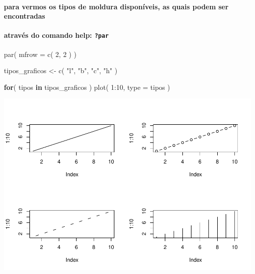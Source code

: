\documentclass[
]{article}
\newenvironment{Shaded}{\begin{snugshade}}{\end{snugshade}}
\newcommand{\AttributeTok}[1]{\textcolor[rgb]{0.77,0.63,0.00}{#1}}
\newcommand{\ControlFlowTok}[1]{\textcolor[rgb]{0.13,0.29,0.53}{\textbf{#1}}}
\newcommand{\DecValTok}[1]{\textcolor[rgb]{0.00,0.00,0.81}{#1}}
\newcommand{\FunctionTok}[1]{\textcolor[rgb]{0.00,0.00,0.00}{#1}}
\newcommand{\NormalTok}[1]{#1}
\newcommand{\OtherTok}[1]{\textcolor[rgb]{0.56,0.35,0.01}{#1}}
\newcommand{\SpecialCharTok}[1]{\textcolor[rgb]{0.00,0.00,0.00}{#1}}
\newcommand{\StringTok}[1]{\textcolor[rgb]{0.31,0.60,0.02}{#1}}
\begin{document}
\hypertarget{para-vermos-os-tipos-de-moldura-disponuxedveis-as-quais-podem-ser-encontradas}{%
\paragraph{para vermos os tipos de moldura disponíveis, as quais podem
ser
encontradas}\label{para-vermos-os-tipos-de-moldura-disponuxedveis-as-quais-podem-ser-encontradas}}

\hypertarget{atravuxe9s-do-comando-help-par}{%
\paragraph{\texorpdfstring{através do comando help:
\texttt{?par}}{através do comando help: ?par}}\label{atravuxe9s-do-comando-help-par}}

\begin{Shaded}
\begin{Highlighting}[]
\FunctionTok{par}\NormalTok{( }\AttributeTok{mfrow =} \FunctionTok{c}\NormalTok{( }\DecValTok{2}\NormalTok{, }\DecValTok{2}\NormalTok{ ) )}

\NormalTok{tipos\_graficos }\OtherTok{\textless{}{-}} \FunctionTok{c}\NormalTok{( }\StringTok{"l"}\NormalTok{, }\StringTok{"b"}\NormalTok{, }\StringTok{"c"}\NormalTok{, }\StringTok{"h"}\NormalTok{ ) }

\ControlFlowTok{for}\NormalTok{( tipos }\ControlFlowTok{in}\NormalTok{ tipos\_graficos ) }\FunctionTok{plot}\NormalTok{( }\DecValTok{1}\SpecialCharTok{:}\DecValTok{10}\NormalTok{, }\AttributeTok{type =}\NormalTok{ tipos )}
\end{Highlighting}
\end{Shaded}

\includegraphics{presencial_função_plot_04_turma_B_files/figure-latex/unnamed-chunk-10-1.pdf}
\end{document}
